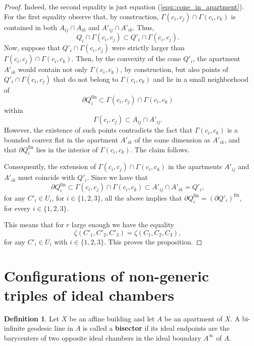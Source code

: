 \documentclass[11pt]{amsart}
\theoremstyle{plain}
\theoremstyle{definition}
\newtheorem{Def}[thm]{Definition}
\theoremstyle{remark}
\begin{document}
\begin{proof}
Indeed, the second equality is just equation (\ref{equ::cone_in_apartment}). For the first equality observe that, by construction, \( \Gamma(c_i,c_j)\cap\Gamma(c_i,c_k) \) is contained in both $A_{ij}\cap A_{ik}$ and $A'_{ij}\cap A'_{ik}$. Thus, \[ Q_i\cap\Gamma(c_i,c_j)\subset Q'_i\cap\Gamma(c_i,c_j). \] Now, suppose that $Q'_i\cap\Gamma(c_i,c_j)$ were strictly larger than $\Gamma(c_i,c_j)\cap\Gamma(c_i,c_k)$. Then, by the convexity of the cone $Q'_i$, the apartment $A'_{ik}$ would contain not only $\Gamma(c_i,c_k)$, by construction, but also points of $Q'_i\cap\Gamma(c_i,c_j)$ that do not belong to $\Gamma(c_i,c_k)$ and lie in a small neighborhood of \[ \partial Q_i^{\mathrm{fin}}\subset \Gamma(c_i,c_j)\cap\Gamma(c_i,c_k) \] within \[ \Gamma(c_i,c_j)\subset A_{ij}\cap A'_{ij}. \] However, the existence of such points contradicts the fact that $\Gamma(c_i,c_k)$ is a bounded convex flat in the apartment $A'_{ik}$ of the same dimension as $A'_{ik}$, and that $\partial Q_i^{\mathrm{fin}}$ lies in the interior of $\Gamma(c_i,c_k)$. The claim follows.
 
 Consequently, the extension of \( \Gamma(c_i,c_j)\cap\Gamma(c_i,c_k) \) in the apartments \(A'_{ij}\) and \(A'_{ik}\) must coincide with \(Q'_i\). Since we have that 
		$$ \partial Q_i^{\mathrm{fin}} \subset  \Gamma(c_i, c_j)\cap \Gamma(c_i, c_k)  \subset A'_{ij} \cap A'_{ik} =Q'_i,$$
		for any $C'_i \in U_i$, for $i \in \{1,2,3\}$, all the above implies that $\partial Q_i^{\mathrm{fin}} = (\partial Q'_i)^{\mathrm{fin}}$, for every $i \in \{1,2,3\}$.
		
		This means that for $r$ large enough we have the equality
		$$\zeta(C'_1,C'_2,C'_3) = \zeta(C_1,C_2,C_3),$$
		for any $C'_i \in U_i$ with $i \in \{1,2,3\}$. This proves the proposition. 
		
	\end{proof}
	
	\section{Configurations of non-generic triples of ideal chambers}
	\label{sec::configurations_non-generic}
	
	\begin{Def}
		Let $X$ be an affine building and let $A$ be an apartment of $X$. A bi-infinite geodesic line in $A$ is called a \textbf{bisector} if its ideal endpoints are the barycenters of two opposite ideal chambers in the ideal boundary $A^{\infty}$ of $A$.
	\end{Def}
	
\end{document}
